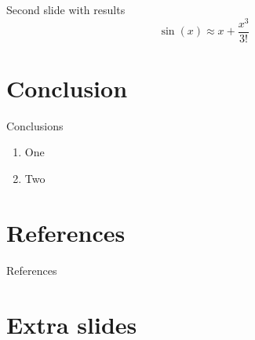 \documentclass[
aspectratio=169,
16pt,
xcolor={dvipsnames} %
]{beamer}
\begin{document}
	\begin{frame}[c]{Second slide with results}
		\[
		\sin(x) \approx x + \frac{x^3}{3!}
		\]
	\end{frame}
	
	\section{Conclusion}
	\begin{frame}[c]{Conclusions}
		\begin{enumerate}
			\item One
			\item Two
		\end{enumerate}
	\end{frame}

\section{References}
\begin{frame}[c]{References}
	\printbibliography
\end{frame}
	
	
	\section{Extra slides}
	
\end{document}
